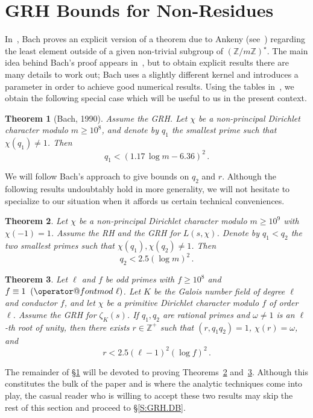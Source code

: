 \documentclass{amsart}
\newtheorem{theorem}{Theorem}[section]
\numberwithin{equation}{section}
\numberwithin{table}{section}
\begin{document}
\section{GRH Bounds for Non-Residues}\label{S:GRH.nonresidues}

In~\cite{bach:1990}, Bach proves an explicit version of a theorem due to Ankeny (see~\cite{ankeny}) regarding
the least element outside of a given non-trivial subgroup of $({\mathbb{Z}}/m{\mathbb{Z}})^\star$.  The main idea behind Bach's
proof appears in~\cite{montgomery:book}, but to obtain explicit results there are many details to work out;
Bach uses a slightly different kernel and introduces a parameter in order to achieve good numerical results.
Using the tables in~\cite{bach:1990}, we 
obtain the following special case which will be useful to us in the present context.
\begin{theorem}[Bach, 1990]\label{T:bach}
Assume the GRH.
Let $\chi$ be a non-principal Dirichlet character modulo $m\geq 10^8$,
and denote by $q_1$ the smallest prime such that
\mbox{$\chi(q_1)\neq 1$}.
Then
$$
  q_1<(1.17\,\log m-6.36)^2
  \,.
$$
\end{theorem}
We will follow Bach's approach to give bounds on $q_2$ and $r$.
Although the following results undoubtably hold in more generality,
we will not hesitate to specialize to our situation when it affords us certain technical conveniences.

\begin{theorem}\label{T:GRHq2}
Let $\chi$ be a non-principal Dirichlet character modulo $m\geq 10^{9}$ with $\chi(-1)=1$.
Assume the RH and the GRH for $L(s,\chi)$.
Denote by $q_1<q_2$ the two smallest primes such that $\chi(q_1),\chi(q_2)\neq 1$.
Then
$$
  q_2<2.5(\log m)^2
  \,.
$$
\end{theorem}

\begin{theorem}\label{T:GRHr}
Let $\ell$ and $f$ be odd primes with $f\geq 10^8$ and $f\equiv 1{\allowbreak\mkern10mu({\operator@font mod}\,\,{\ell})}$.
  Let $K$ be the Galois number field of degree $\ell$ and conductor $f$,
and let $\chi$ be a primitive Dirichlet character modulo $f$ of order $\ell$.
  Assume the GRH for $\zeta_K(s)$.
  If $q_1,q_2$ are rational primes and
  $\omega\neq 1$ is an $\ell$-th root of unity, then
  there exists $r\in{\mathbb{Z}}^+$ such that $(r,q_1 q_2)=1$, $\chi(r)=\omega$, and
  $$
    r<2.5(\ell-1)^2(\log f)^2
    \,.
  $$
\end{theorem}

The remainder of \S\ref{S:GRH.nonresidues} will be devoted to proving
Theorems~\ref{T:GRHq2} and~\ref{T:GRHr}.
Although this constitutes the bulk of the paper and is where the analytic techniques come into play,
the casual reader who is willing to accept these two results may skip the rest of this section and proceed to \S\ref{S:GRH.DB}.
\end{document}
